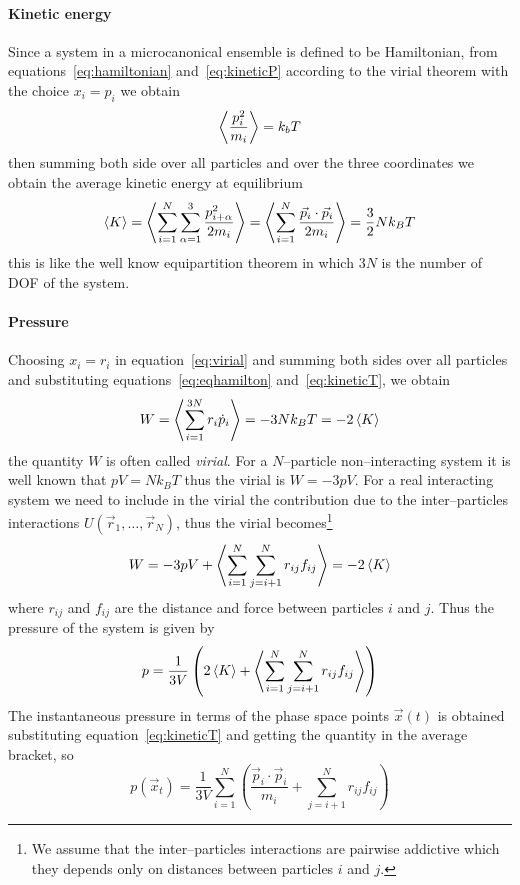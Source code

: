 \paragraph{\textbf{Kinetic energy}} Since a system in a microcanonical ensemble is defined to be Hamiltonian,
from equations~\eqref{eq:hamiltonian} and~\eqref{eq:kineticP} according to the virial theorem with the choice
$x_i = p_{i}$ we obtain
\begin{equation*}
	\left \langle \frac{p^2_{i}}{m_i} \right \rangle = k_bT
\end{equation*}
then summing both side over all particles and over the three coordinates we obtain the average kinetic energy at
equilibrium
\begin{equation}
	\left \langle K \right \rangle = \left \langle  \sum_{i=1}^{N}\sum_{\alpha=1}^{3}\frac{p_{i+\alpha}^2}{2m_i}  \right \rangle = \left \langle \sum_{i=1}^{N}\frac{\vec p_i\cdot \vec p_i}{2m_i} \right \rangle = \frac{3}{2}Nk_B T
	\label{eq:kineticT}
\end{equation}
this is like the well know equipartition theorem in which $3N$ is the number of \ac{DOF} of the system.

\paragraph{\textbf{Pressure}} Choosing $x_i = r_i$ in equation~\eqref{eq:virial} and summing both sides over all
particles and substituting equations~\eqref{eq:eqhamilton} and~\eqref{eq:kineticT}, we obtain
\begin{equation*}
	W = \left \langle \sum_{i=1}^{3N} r_i\dot p_i \right \rangle = -3Nk_B T = - 2 \left \langle K \right \rangle
\end{equation*}
the quantity $W$ is often called \textit{virial}. For a $N$--particle non--interacting system it is well known
that $pV = Nk_B T$ thus the virial is $W = -3pV$. For a real interacting system we need to include in the virial
the contribution due to the inter--particles interactions $U(\vec r_1,\dots,\vec r_N)$, thus the virial
becomes\footnote{We assume that the inter--particles interactions are pairwise addictive which they depends only
on distances between particles $i$ and $j$.}
\begin{equation*}
	W = -3pV + \left \langle  \sum_{i=1}^N\sum_{j=i+1}^Nr_{ij}f_{ij}  \right \rangle = - 2 \left \langle K \right \rangle
\end{equation*}
where $r_{ij}$ and $f_{ij}$ are the distance and force between particles $i$ and $j$. Thus the pressure of the
system is given by
\begin{equation*}
	p = \frac{1}{3V}\left (2 \left \langle K \right \rangle + \left \langle  \sum_{i=1}^N\sum_{j=i+1}^Nr_{ij}f_{ij}  \right \rangle \right )
\end{equation*}
The instantaneous pressure in terms of the phase space points $\vec x(t)$ is obtained substituting
equation~\eqref{eq:kineticT} and getting the quantity in the average bracket, so
\begin{equation}
	p(\vec x_t) = \frac{1}{3V} \sum_{i=1}^{N} \left ( \frac{\vec p_i \cdot \vec p_i}{m_i} +  \sum_{j=i+1}^Nr_{ij}f_{ij}  \right )
	\label{eq:pressure}
\end{equation}


